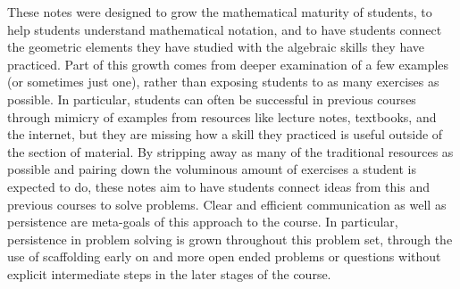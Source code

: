 \begin{annotation}
These notes were designed to grow the mathematical maturity of students, to help students understand mathematical notation, and to have students connect the geometric elements they have studied with the algebraic skills they have practiced. Part of this growth comes from deeper examination of a few examples (or sometimes just one), rather than exposing students to as many exercises as possible. In particular, students can often be successful in previous courses through mimicry of examples from resources like lecture notes, textbooks, and the internet, but they are missing how a skill they practiced is useful outside of the section of material. By stripping away as many of the traditional resources as possible and pairing down the voluminous amount of exercises a student is expected to do, these notes aim to have students connect ideas from this and previous courses to solve problems. Clear and efficient communication as well as persistence are meta-goals of this approach to the course. In particular, persistence in problem solving is grown throughout this problem set, through the use of scaffolding early on and more open ended problems or questions without explicit intermediate steps in the later stages of the course.


\end{annotation}
